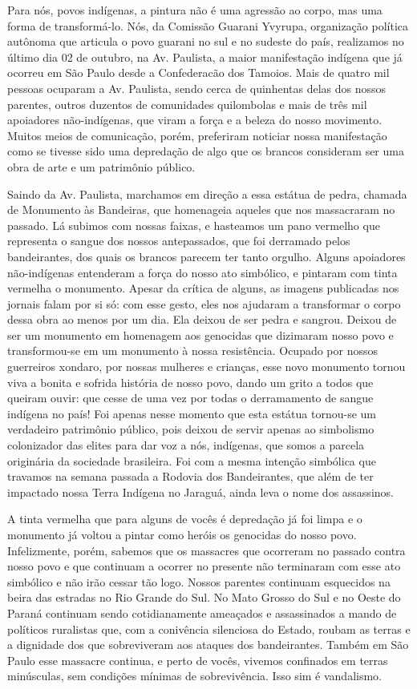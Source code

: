 Para nós, povos indígenas, a pintura não é uma agressão ao corpo, mas
uma forma de transformá-lo. Nós, da Comissão Guarani Yvyrupa,
organização política autônoma que articula o povo guarani no sul
e no sudeste do país, realizamos no último dia 02 de outubro, na Av.
Paulista, a maior manifestação indígena que já ocorreu em São Paulo
desde a Confederacão dos Tamoios. Mais de quatro mil pessoas ocuparam a
Av. Paulista, sendo cerca de quinhentas delas dos nossos parentes,
outros duzentos de comunidades quilombolas e mais de três mil
apoiadores não-indígenas, que viram a força e a beleza do nosso
movimento. Muitos meios de comunicação, porém, preferiram noticiar
nossa manifestação como se tivesse sido uma depredação de algo que os
brancos consideram ser uma obra de arte e um patrimônio público. 

Saindo da Av. Paulista, marchamos em direção a essa estátua de pedra,
chamada de Monumento às Bandeiras, que homenageia aqueles que nos
massacraram no passado. Lá subimos com nossas faixas, e hasteamos um
pano vermelho que representa o sangue dos nossos antepassados, que foi
derramado pelos bandeirantes, dos quais os brancos parecem ter tanto
orgulho. Alguns apoiadores não-indígenas entenderam a força do nosso
ato simbólico, e pintaram com tinta vermelha o monumento. Apesar da
crítica de alguns, as imagens publicadas nos jornais falam por si só:
com esse gesto, eles nos ajudaram a transformar o corpo dessa obra ao
menos por um dia. Ela deixou de ser pedra e sangrou. Deixou de ser um
monumento em homenagem aos genocidas que dizimaram nosso povo e
transformou-se em um monumento à nossa resistência. Ocupado por nossos
guerreiros xondaro, por nossas mulheres e crianças, esse novo
monumento tornou viva a bonita e sofrida história de nosso povo, dando
um grito a todos que queiram ouvir: que cesse de uma vez por todas o
derramamento de sangue indígena no país! Foi apenas nesse momento que
esta estátua tornou-se um verdadeiro patrimônio público, pois deixou de
servir apenas ao simbolismo colonizador das elites para dar voz a nós,
indígenas, que somos a parcela originária da sociedade brasileira. Foi
com a mesma intenção simbólica que travamos na semana passada a Rodovia
dos Bandeirantes, que além de ter impactado nossa Terra Indígena no
Jaraguá, ainda leva o nome dos assassinos.

A tinta vermelha que para alguns de vocês é depredação já foi limpa e o
monumento já voltou a pintar como heróis os genocidas do nosso povo.
Infelizmente, porém, sabemos que os massacres que ocorreram no passado
contra nosso povo e que continuam a ocorrer no presente não terminaram
com esse ato simbólico e não irão cessar tão logo. Nossos parentes
continuam esquecidos na beira das estradas no Rio Grande do Sul. No
Mato Grosso do Sul e no Oeste do Paraná continuam sendo cotidianamente
ameaçados e assassinados a mando de políticos ruralistas que, com
a conivência silenciosa do Estado, roubam as terras e a dignidade dos
que sobreviveram aos ataques dos bandeirantes. Também em São Paulo esse
massacre continua, e perto de vocês, vivemos confinados em terras
minúsculas, sem condições mínimas de sobrevivência. Isso sim é
vandalismo.

